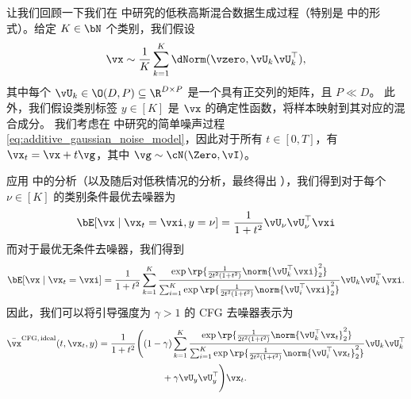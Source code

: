 \documentclass[../../book-main_zh.tex]{subfiles}
\begin{document}
\begin{example}\label{example:denoising-gaussian-mixture-cfg}
    让我们回顾一下我们在  中研究的低秩高斯混合数据生成过程（特别是  中的形式）。给定 $K \in \bN$ 个类别，我们假设
    \begin{equation}\label{eq:MoG1-ch6}
        \vx \sim \frac{1}{K}\sum_{k = 1}^{K}\dNorm(\vzero,
        \vU_{k}\vU_{k}^{\top}),
    \end{equation}
    其中每个 \(\vU_{k} \in \O(D, P) \subseteq \R^{D \times P}\) 是一个具有正交列的矩阵，且 $P \ll D$。
    此外，我们假设类别标签 $y \in [K]$ 是 $\vx$ 的确定性函数，将样本映射到其对应的混合成分。
    我们考虑在  中研究的简单噪声过程 \eqref{eq:additive_gaussian_noise_model}，因此对于所有 $t \in [0, T]$，有 $\vx_t = \vx + t \vg$，其中 $\vg \sim \cN(\Zero,
    \vI)$。

    应用  中的分析（以及随后对低秩情况的分析，最终得出 ），我们得到对于每个 $\nu \in [K]$ 的类别条件最优去噪器为
    \begin{equation}\label{eq:gmm_lowrank_denoiser-ch6-classcond}
        \bE[ \vx \mid \vx_t = \vxi, y = \nu ]
        = \frac{1}{1 + t^{2}}
        \vU_{\nu}\vU_{\nu}^{\top}\vxi
    \end{equation}
    而对于最优无条件去噪器，我们得到
    \begin{equation}\label{eq:gmm_lowrank_denoiser-ch6-uncond}
        \bE[ \vx \mid \vx_t = \vxi ]
        = \frac{1}{1 + t^{2}}\sum_{k =
        1}^{K}\frac{\exp\rp{\frac{1}{2t^{2}(1 +
        t^{2})}\norm{\vU_{k}^{\top}\vxi}_{2}^{2}}}{\sum_{i =
            1}^{K}\exp\rp{\frac{1}{2t^{2}(1 +
        t^{2})}\norm{\vU_{i}^{\top}\vxi}_{2}^{2}}}\vU_{k}\vU_{k}^{\top}\vxi.
    \end{equation}
    因此，我们可以将引导强度为 $\gamma > 1$ 的 CFG 去噪器表示为
    \begin{equation}\label{eq:cfg-denoiser-mog-low-rank}
        \begin{split}
            \bar{\vx}^{\mathrm{CFG,\,ideal}}(t, \vx_t, y)
            =
            \frac{1}{1 + t^{2}}
            \Biggl(
                &(1 - \gamma)
                \sum_{k = 1}^{K}\frac{\exp\rp{\frac{1}{2t^{2}(1
                + t^{2})}\norm{\vU_{k}^{\top}\vx_t}_{2}^{2}}}{\sum_{i
                    = 1}^{K}\exp\rp{\frac{1}{2t^{2}(1
                                +
                t^{2})}\norm{\vU_{i}^{\top}\vx_t}_{2}^{2}}}\vU_{k}\vU_{k}^{\top}
                \\
                &\qquad+
                \gamma
                \vU_{y}\vU_{y}^{\top}
            \Biggr)
            \vx_t.
        \end{split}
    \end{equation}


\end{example}
\end{document}
